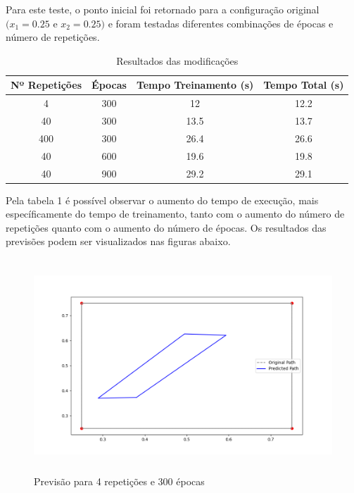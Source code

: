 \documentclass[12 pt]{article}
\begin{document}
\begin{enumerate}
    Para este teste, o ponto inicial foi retornado para a configuração original $(x_1=0.25$ e $x_2=0.25)$ e foram testadas diferentes combinações de épocas e número de repetições.

    \begin{table}[H]
        \centering
        \caption{Resultados das modificações}
        \begin{tabular}{|c|c|c|c|}
            \hline
            Nº Repetições & Épocas & Tempo Treinamento (s) & Tempo Total (s) \\
            \hline
            4 & 300 & 12 & 12.2 \\
            \hline
            40 & 300 & 13.5 & 13.7 \\
            \hline
            400 & 300 & 26.4 & 26.6 \\
            \hline
            40 & 600 & 19.6 & 19.8 \\
            \hline
            40 & 900 & 29.2 & 29.1 \\
            \hline
        \end{tabular}
    \end{table}

    Pela tabela 1 é possível observar o aumento do tempo de execução, mais específicamente do tempo de treinamento, tanto com o aumento do número de repetições quanto com o aumento do número de épocas. Os resultados das previsões podem ser visualizados nas figuras abaixo.
    

    \begin{figure}[H]
        \caption{Previsão para 4 repetições e 300 épocas}
           \centering
           \includegraphics[height=8cm]{fig/Item_4_4_300.png}
    \end{figure}


\end{enumerate}
\end{document}
